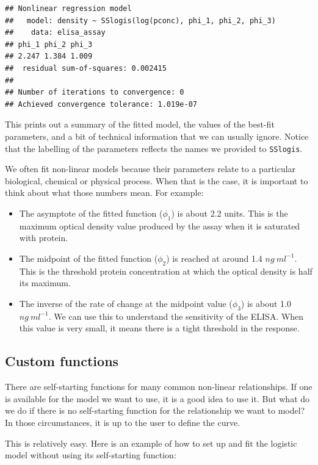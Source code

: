 \documentclass[
]{book}
\providecommand{\tightlist}{%
  \setlength{\itemsep}{0pt}\setlength{\parskip}{0pt}}
\begin{document}
\begin{verbatim}
## Nonlinear regression model
##   model: density ~ SSlogis(log(pconc), phi_1, phi_2, phi_3)
##    data: elisa_assay
## phi_1 phi_2 phi_3 
## 2.247 1.384 1.009 
##  residual sum-of-squares: 0.002415
## 
## Number of iterations to convergence: 0 
## Achieved convergence tolerance: 1.019e-07
\end{verbatim}

This prints out a summary of the fitted model, the values of the best-fit parameters, and a bit of technical information that we can usually ignore. Notice that the labelling of the parameters reflects the names we provided to \texttt{SSlogis}.

We often fit non-linear models because their parameters relate to a particular biological, chemical or physical process. When that is the case, it is important to think about what those numbers mean. For example:

\begin{itemize}
\tightlist
\item
  The asymptote of the fitted function (\(\phi_1\)) is about 2.2 units. This is the maximum optical density value produced by the assay when it is saturated with protein.
\item
  The midpoint of the fitted function (\(\phi_2\)) is reached at around 1.4 \(ng\ ml^{-1}\). This is the threshold protein concentration at which the optical density is half its maximum.
\item
  The inverse of the rate of change at the midpoint value (\(\phi_3\)) is about 1.0 \(ng\ ml^{-1}\). We can use this to understand the sensitivity of the ELISA. When this value is very small, it means there is a tight threshold in the response.
\end{itemize}

\hypertarget{custom-functions}{%
\subsection{Custom functions}\label{custom-functions}}

There are self-starting functions for many common non-linear relationships. If one is available for the model we want to use, it is a good idea to use it. But what do we do if there is no self-starting function for the relationship we want to model? In those circumstances, it is up to the user to define the curve.

This is relatively easy. Here is an example of how to set up and fit the logistic model without using its self-starting function:
\end{document}
